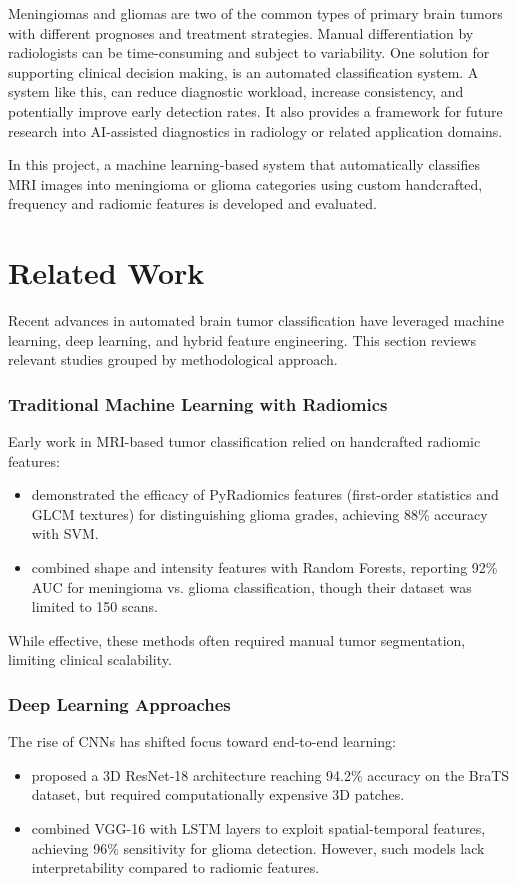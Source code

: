 \documentclass[11pt,a4paper]{report}
\begin{document}
Meningiomas and gliomas are two of the common types of primary brain tumors with 
different prognoses and treatment strategies. 
Manual differentiation by radiologists can be time-consuming 
and subject to variability. 
One solution for supporting clinical decision making, is an automated classification system.
A system like this, can reduce diagnostic workload, 
increase consistency, and potentially improve early detection rates. 
It also provides a framework for future research 
into AI-assisted diagnostics in radiology or related application domains.

In this project, a machine learning-based system that automatically 
classifies MRI images into meningioma or glioma categories 
using custom handcrafted, frequency and radiomic features 
is developed and evaluated.

\chapter{Related Work}


Recent advances in automated brain tumor classification have leveraged machine learning, deep learning, and hybrid feature engineering. This section reviews relevant studies grouped by methodological approach.

\subsection{Traditional Machine Learning with Radiomics}
Early work in MRI-based tumor classification relied on handcrafted radiomic features:
\begin{itemize}
    \item  demonstrated the efficacy of PyRadiomics features (first-order statistics and GLCM textures) for distinguishing glioma grades, achieving 88\% accuracy with SVM.
    \item  combined shape and intensity features with Random Forests, reporting 92\% AUC for meningioma vs. glioma classification, though their dataset was limited to 150 scans.
\end{itemize}
While effective, these methods often required manual tumor segmentation, limiting clinical scalability.

\subsection{Deep Learning Approaches}
The rise of CNNs has shifted focus toward end-to-end learning:
\begin{itemize}
    \item proposed a 3D ResNet-18 architecture reaching 94.2\% accuracy on the BraTS dataset, but required computationally expensive 3D patches.
    \item  combined VGG-16 with LSTM layers to exploit spatial-temporal features, achieving 96\% sensitivity for glioma detection. However, such models lack interpretability compared to radiomic features.
\end{itemize}
\end{document}

